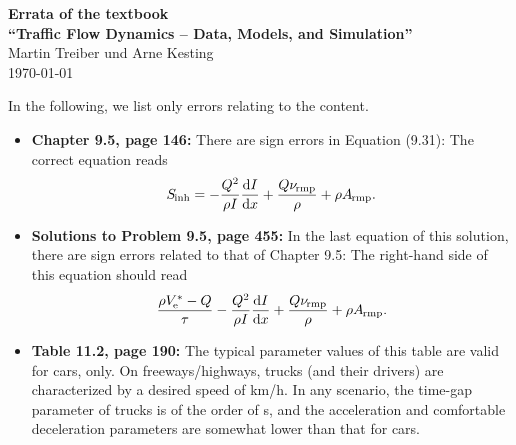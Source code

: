 \documentclass[11pt,a4paper]{scrreprt}
\providecommand{\be}{\begin{equation}}
\providecommand{\ee}{\end{equation}}
\providecommand{\bdm}{\begin{displaymath}}
\providecommand{\edm}{\end{displaymath}}
\providecommand{\secfont}[1]{{\Large\sf\textbf{#1}}}
\providecommand{\abl}[2]{\frac{{\rm d} #1}{{\rm d} #2}}  %
\providecommand{\sub}[1]{_{\text{{\scriptsize \hspace{-0.2ex}#1}}}}
\begin{document}
\begin{center}
\secfont{Errata of the textbook\\[0.3em]
``Traffic Flow Dynamics --  Data, Models, and Simulation''}
\\[1em]

Martin Treiber und Arne Kesting
\\[1em]

\today
\end{center}
\vspace{1em}


In the following, we list only errors relating to the content.


\begin{itemize}

\item
\textbf{Chapter 9.5, page 146:}
There are sign errors in Equation (9.31): The correct equation reads
\setcounter{chapter}{9}
\setcounter{equation}{30}
\be
S\sub{inh}=-\frac{Q^2}{\rho I} \abl{I}{x}
+\frac{Q \nu\sub{rmp}}{\rho}+\rho A\sub{rmp}.
\ee

\item \textbf{Solutions to Problem 9.5, page 455:}
In the last equation of this solution, there are sign errors related to that of Chapter
9.5: The right-hand side of this equation should read
\bdm
\frac{\rho V^*\sub{e}-Q}{\tau} -\frac{Q^2}{\rho I} \abl{I}{x}
+\frac{Q \nu\sub{rmp}}{\rho}+\rho A\sub{rmp}.
\edm


\item \textbf{Table 11.2, page 190:}
The typical parameter values of this table are valid for cars, only. On freeways/highways, trucks (and
their drivers) are characterized by a desired speed of
\unit[80]{km/h}. In any scenario, the time-gap parameter of  trucks is
 of the order of \unit[2]{s}, and the 
acceleration and comfortable deceleration parameters are somewhat
lower than that for cars.


\end{itemize}
\end{document}
